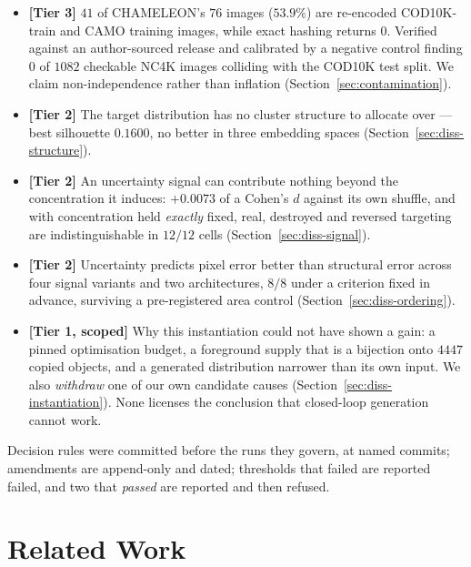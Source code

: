 \documentclass{article} %
\begin{document}
\begin{itemize}
\itemsep0.10em
\item \textbf{[Tier 3]} $41$ of CHAMELEON's $76$ images ($53.9\%$) are re-encoded COD10K-train and
CAMO training images, while exact hashing returns $0$. Verified against an author-sourced release and
calibrated by a negative control finding $0$ of $1082$ checkable NC4K images colliding with the COD10K
test split. We claim non-independence rather than inflation (Section~\ref{sec:contamination}).
\item \textbf{[Tier 2]} The target distribution has no cluster structure to allocate over --- best
silhouette $0.1600$, no better in three embedding spaces (Section~\ref{sec:diss-structure}).
\item \textbf{[Tier 2]} An uncertainty signal can contribute nothing beyond the concentration it
induces: $+0.0073$ of a Cohen's $d$ against its own shuffle, and with concentration held \emph{exactly}
fixed, real, destroyed and reversed targeting are indistinguishable in $12/12$ cells
(Section~\ref{sec:diss-signal}).
\item \textbf{[Tier 2]} Uncertainty predicts pixel error better than structural error across four
signal variants and two architectures, $8/8$ under a criterion fixed in advance, surviving a
pre-registered area control (Section~\ref{sec:diss-ordering}).
\item \textbf{[Tier 1, scoped]} Why this instantiation could not have shown a gain: a pinned
optimisation budget, a foreground supply that is a bijection onto $4447$ copied objects, and a
generated distribution narrower than its own input. We also \emph{withdraw} one of our own candidate
causes (Section~\ref{sec:diss-instantiation}). None licenses the conclusion that closed-loop
generation cannot work.
\end{itemize}

Decision rules were committed before the runs they govern, at named commits; amendments are
append-only and dated; thresholds that failed are reported failed, and two that \emph{passed} are
reported and then refused.

\section{Related Work}
\label{sec:related}
\end{document}
